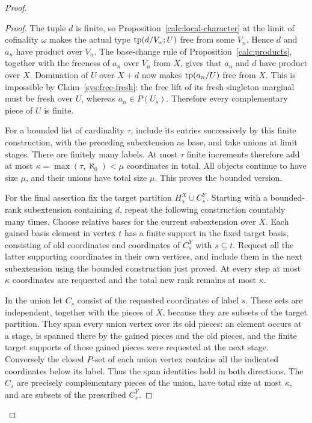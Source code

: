 \begin{proof}
\begin{proof}
The tuple $d$ is finite, so Proposition~\ref{calc:local-character}
at the limit of
cofinality $\omega$ makes the actual type $\operatorname{tp}(d/V_\omega;U)$ free from
some $V_n$.  Hence $d$ and $a_n$ have product over $V_n$.
The base-change rule of Proposition~\ref{calc:products},
together with the freeness
of $a_n$ over $V_n$ from $X$, gives that $a_n$ and $d$ have
product over $X$.  Domination of $U$ over $X+d$ now makes
$\operatorname{tp}(a_n/U)$ free from $X$.  This is impossible by
Claim~\ref{sys:free-fresh}: the free lift of its fresh
singleton marginal must be fresh over $U$, whereas
$a_n\in P(U_s)$.  Therefore every complementary piece of
$U$ is finite.

For a bounded list of cardinality $\tau$, include its entries
successively by this finite construction, with the preceding
subextension as base, and take unions at limit stages.
There are finitely many labels.  At most $\tau$ finite
increments therefore add at most
$\kappa=\max(\tau,\aleph_0)<\mu$ coordinates in total.
All objects continue to have size $\mu$, and their unions have
total size $\mu$.  This proves the bounded version.

For the final assertion fix the target partition
$H_s^X\mathbin{\dot\cup}C_s^Y$.  Starting with a bounded-rank
subextension containing $d$, repeat the following construction
countably many times.  Choose relative bases for the current
subextension over $X$.  Each gained basis element in vertex
$t$ has a finite support in the fixed target basis, consisting
of old coordinates and coordinates of $C_s^Y$ with
$s\subseteq t$.  Request all the latter supporting
coordinates in their own vertices, and include them in the
next subextension using the bounded construction just proved.
At every step at most $\kappa$ coordinates are requested and
the total new rank remains at most $\kappa$.

In the union let $C_s$ consist of the requested coordinates
of label $s$.  These sets are independent, together with the
pieces of $X$, because they are subsets of the target
partition.  They span every union vertex over its old pieces:
an element occurs at a stage, is spanned there by the gained
pieces and the old pieces, and the finite target supports of
those gained pieces were requested at the next stage.
Conversely the closed $P$-set of each union vertex contains
all the indicated coordinates below its label.  Thus the
span identities hold in both directions.  The $C_s$ are
precisely complementary pieces of the union, have total
size at most $\kappa$, and are subsets of the prescribed
$C_s^Y$.
\end{proof}


\end{proof}
